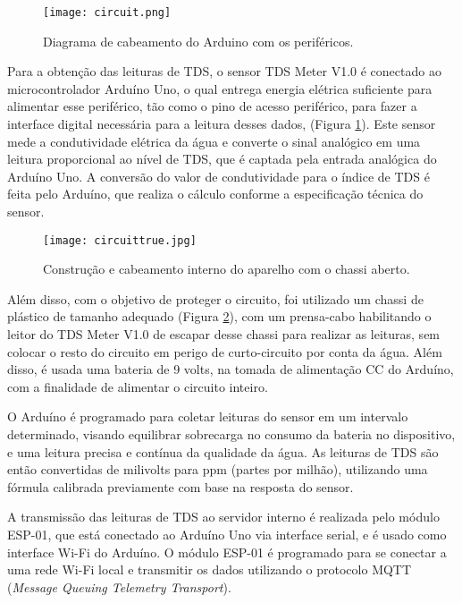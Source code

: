 \documentclass[12pt]{article}
\begin{document}
\begin{figure}[htbp!]
    \centering
    \texttt{[image: circuit.png]}
    \caption{Diagrama de cabeamento do Arduino com os periféricos.}
    \label{fig:dispositivo}
\end{figure}

Para a obtenção das leituras de TDS, o sensor TDS Meter V1.0 é conectado ao microcontrolador Arduíno Uno, o qual entrega energia elétrica suficiente para alimentar esse periférico, tão como o pino de acesso periférico, para fazer a interface digital necessária para a leitura desses dados, (Figura \ref{fig:dispositivo}). Este sensor mede a condutividade elétrica da água e converte o sinal analógico em uma leitura proporcional ao nível de TDS, que é captada pela entrada analógica do Arduíno Uno. A conversão do valor de condutividade para o índice de TDS é feita pelo Arduíno, que realiza o cálculo conforme a especificação técnica do sensor.

\begin{figure}[htbp!]
    \centering
    \texttt{[image: circuittrue.jpg]}
    \caption{Construção e cabeamento interno do aparelho com o chassi aberto.}
    \label{fig:chassi}
\end{figure}

Além disso, com o objetivo de proteger o circuito, foi utilizado um chassi de plástico de tamanho adequado (Figura \ref{fig:chassi}), com um prensa-cabo habilitando o leitor do TDS Meter V1.0 de escapar desse chassi para realizar as leituras, sem colocar o resto do circuito em perigo de curto-circuito por conta da água. Além disso, é usada uma bateria de 9 volts, na tomada de alimentação CC do Arduíno, com a finalidade de alimentar o circuito inteiro.

O Arduíno é programado para coletar leituras do sensor em um intervalo determinado, visando equilibrar sobrecarga no consumo da bateria no dispositivo, e uma leitura precisa e contínua da qualidade da água. As leituras de TDS são então convertidas de milivolts para ppm (partes por milhão), utilizando uma fórmula calibrada previamente com base na resposta do sensor.

A transmissão das leituras de TDS ao servidor interno é realizada pelo módulo ESP-01, que está conectado ao Arduíno Uno via interface serial, e é usado como interface Wi-Fi do Arduíno. O módulo ESP-01 é programado para se conectar a uma rede Wi-Fi local e transmitir os dados utilizando o protocolo MQTT (\textit{Message Queuing Telemetry Transport}).
\end{document}
